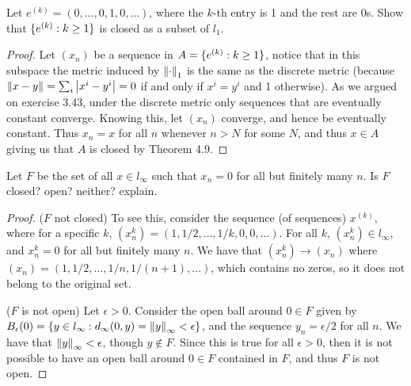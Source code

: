 \begin{exercise}{11}
Let $e^{(k)}=(0,\dots,0,1,0,\dots)$, where the $k$-th entry is 1 and the rest are 0s. 
Show that $\{e^{(k)}:k\geq 1\}$ is closed as a subset of $l_1$.
\end{exercise}
\begin{proof}
Let $(x_n)$ be a sequence in $A=\{e^{(k)}:k\geq 1\}$, notice that in this subspace the metric induced by $\left\lVert \cdot\right\rVert_1$ is the same as the discrete metric (because $\left\lVert x-y\right\rVert=\sum_i\left\lvert x^i-y^i\right\rvert=0$ if and only if $x^i=y^i$ and 1 otherwise). 
As we argued on exercise 3.43, under the discrete metric only sequences that are eventually constant converge. 
Knowing this, let $(x_n)$ converge, and hence be eventually constant. 
Thus $x_n=x$ for all $n$ whenever $n>N$ for some $N$, and thus $x\in A$ giving us that $A$ is closed by Theorem 4.9.
\end{proof} 

\begin{exercise}{12}
Let $F$ be the set of all $x\in l_\infty$ such that $x_n=0$ for all but finitely many $n$. 
Is $F$ closed? open? neither? explain.
\end{exercise}
\begin{proof}
($F$ not closed)
To see this, consider the sequence (of sequences) $x^{(k)}$, where for a specific $k$, $(x^k_n)=(1,1/2,\dots,1/k,0,0,\dots)$. 
For all $k$, $(x^k_n)\in l_\infty$, and $x^k_n=0$ for all but finitely many $n$.
We have that $(x^k_n)\to (x_n)$ where $(x_n)=(1,1/2,\dots,1/n,1/(n+1),\dots)$, which contains no zeros, so it does not belong to the original set.

($F$ is not open)
Let $\epsilon>0$. 
Consider the open ball around $0\in F$ given by $B_\epsilon(0)=\{y\in l_\infty:d_\infty(0,y)=\left\lVert y\right\rVert_\infty<\epsilon\}$, and the sequence $y_n=\epsilon/2$ for all $n$.
We have that $\left\lVert y\right\rVert_\infty<\epsilon$, though $y\notin F$.
Since this is true for all $\epsilon>0$, then it is not possible to have an open ball around $0\in F$ contained in $F$, and thus $F$ is not open.
\end{proof} 

